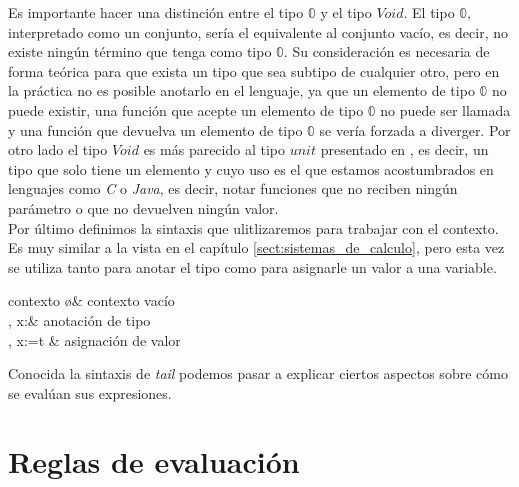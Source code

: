 \bigskip

Es importante hacer una distinción entre el tipo $\mathbb{0}$ y el tipo $Void$. El tipo $\mathbb{0}$, interpretado como un conjunto, sería el equivalente al conjunto vacío, es decir, no existe ningún término que tenga como tipo $\mathbb{0}$. Su consideración es necesaria de forma teórica para que exista un tipo que sea subtipo de cualquier otro, pero en la práctica no es posible anotarlo en el lenguaje, ya que un elemento de tipo $\mathbb{0}$ no puede existir, una función que acepte un elemento de tipo $\mathbb{0}$ no puede ser llamada y una función que devuelva un elemento de tipo $\mathbb{0}$ se vería forzada a diverger. Por otro lado el tipo $Void$ es más parecido al tipo $unit$ presentado en \cite{TPL}, es decir, un tipo que solo tiene un elemento y cuyo uso es el que estamos acostumbrados en lenguajes como \textit{C} o \textit{Java}, es decir, notar funciones que no reciben ningún parámetro o que no devuelven ningún valor.\\

Por último definimos la sintaxis que ulitlizaremos para trabajar con el contexto. Es muy similar a la vista en el capítulo \ref{sect:sistemas_de_calculo}, pero esta vez se utiliza tanto para anotar el tipo como para asignarle un valor a una variable.\\

\hspace*{-2cm}
\begin{grammar}{\Gamma}{contexto}
\o               & contexto vacío \\
\Gamma, x:\tau   & anotación de tipo \\
\Gamma, x:=t     & asignación de valor \\
\end{grammar}

\bigskip


Conocida la sintaxis de \textit{tail} podemos pasar a explicar ciertos aspectos sobre cómo se evalúan sus expresiones.

\section{Reglas de evaluación}
\mathlig{~<}{\ \widetilde{\leq}\ }

